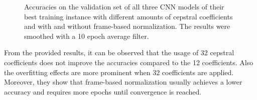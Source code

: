 \begin{figure}[!ht]
  \centering
  \quad
  \caption{Accuracies on the validation set of all three CNN models of their best training instance with different amounts of cepstral coefficients and with and without frame-based normalization. The results were smoothed with a 10 epoch average filter.}
  \label{fig:exp_fs_cepstral_acc}
\end{figure}
\FloatBarrier
\noindent
From the provided results, it can be observed that the usage of 32 cepstral coefficients does not improve the accuracies compared to the 12 coefficients.
Also the overfitting effects are more prominent when 32 coefficients are applied.
Moreover, they show that frame-based normalization usually achieves a lower accuracy and requires more epochs until convergence is reached.

